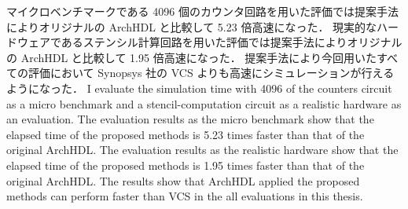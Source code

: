 マイクロベンチマークである 4096 個のカウンタ回路を用いた評価では提案手法によりオリジナルの ArchHDL と比較して 5.23 倍高速になった．
現実的なハードウェアであるステンシル計算回路を用いた評価では提案手法によりオリジナルの ArchHDL と比較して 1.95 倍高速になった．
提案手法により今回用いたすべての評価において Synopsys 社の VCS よりも高速にシミュレーションが行えるようになった．
\fi
I evaluate the simulation time with 4096 of the counters circuit as a micro benchmark and a stencil-computation circuit as a realistic hardware as an evaluation.
The evaluation results as the micro benchmark show that the elapsed time of the proposed methods is 5.23 times faster than that of the original ArchHDL.
The evaluation results as the realistic hardware show that the elapsed time of the proposed methods is 1.95 times faster than that of the original ArchHDL.
The results show that ArchHDL applied the proposed methods can perform faster than VCS in the all evaluations in this thesis.
